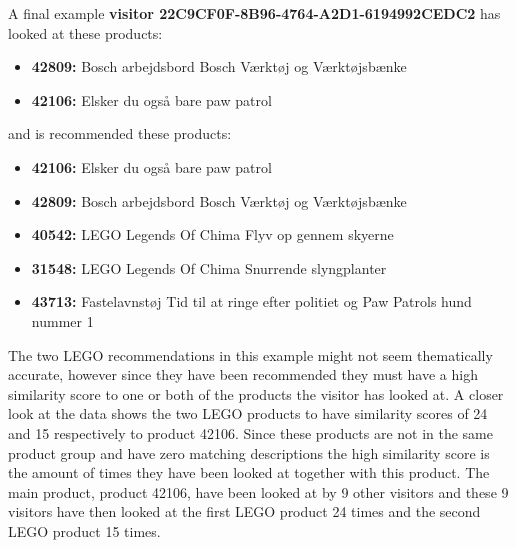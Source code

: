 A final example \textbf{visitor 22C9CF0F-8B96-4764-A2D1-6194992CEDC2} has looked at these products:
\begin{itemize}
\item \textbf{42809: }Bosch arbejdsbord Bosch Værktøj og Værktøjsbænke
\item \textbf{42106: }Elsker du også bare paw patrol
\end{itemize}
and is recommended these products:
\begin{itemize}
\item \textbf{42106: }Elsker du også bare paw patrol
\item \textbf{42809: }Bosch arbejdsbord Bosch Værktøj og Værktøjsbænke
\item \textbf{40542: }LEGO Legends Of Chima Flyv op gennem skyerne
\item \textbf{31548:} LEGO Legends Of Chima Snurrende slyngplanter
\item \textbf{43713:} Fastelavnstøj Tid til at ringe efter politiet og Paw Patrols hund nummer 1
\end{itemize}
The two LEGO recommendations in this example might not seem thematically accurate, however since they have been recommended they must have a high similarity score to one or both of the products the visitor has looked at. A closer look at the data shows the two LEGO products to have similarity scores of 24 and 15 respectively to product 42106. Since these products are not in the same product group and have zero matching descriptions the high similarity score is the amount of times they have been looked at together with this product. The main product, product 42106, have been looked at by 9 other visitors and these 9 visitors have then looked at the first LEGO product 24 times and the second LEGO product 15 times.

 